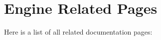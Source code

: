 \section{Engine Related Pages}
Here is a list of all related documentation pages:\begin{CompactList}
\item {}

\end{CompactList}
